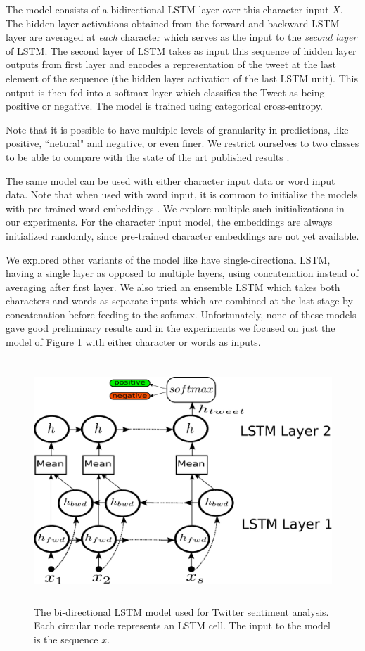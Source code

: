 \documentclass{article} %
\begin{document}
The model consists of a bidirectional LSTM layer over this character input $X$. The hidden layer activations obtained from the forward and backward LSTM layer are averaged at {\it each} character which serves as the input to the {\it second layer} of LSTM. The second layer of LSTM takes as input this sequence of hidden layer outputs from first layer and encodes a representation of the tweet at the last element of the sequence (the hidden layer activation of the last LSTM unit). This output is then fed into a softmax layer which classifies the Tweet as being positive or negative.
The model is trained using categorical cross-entropy.

Note that it is possible to have multiple levels of granularity in predictions, like positive, ``netural" and negative, or even finer.
We restrict ourselves to two classes to be able to compare with the state of the art published results \cite{kalchbrenner2014convolutional}.

The same model can be used with either character input data or word input data. Note that when used with word input, it is common to initialize the models with pre-trained word embeddings \cite{mikolov2013distributed}. We explore multiple such initializations in our experiments.
For the character input model, the embeddings are always initialized randomly, since pre-trained character embeddings are not yet available.

We explored other variants of the model like have single-directional LSTM, having a single layer as opposed to multiple layers, using concatenation instead of averaging after first layer. We also tried an ensemble LSTM which takes both characters and words as separate inputs which are combined at the last stage by concatenation before feeding to the softmax. Unfortunately, none of these models gave good preliminary results and in the experiments we focused on just the model of Figure \ref{fig:mylstm} with either character or words as inputs.

\begin{figure}
	\centering
	\includegraphics[width=\textwidth, height=3.6in]{figs/mylstm.pdf}
	\caption{The bi-directional LSTM model used for Twitter sentiment analysis. Each circular node represents an LSTM cell. The input to the model is the sequence $x$. }
	\label{fig:mylstm}
\end{figure}
\end{document}

